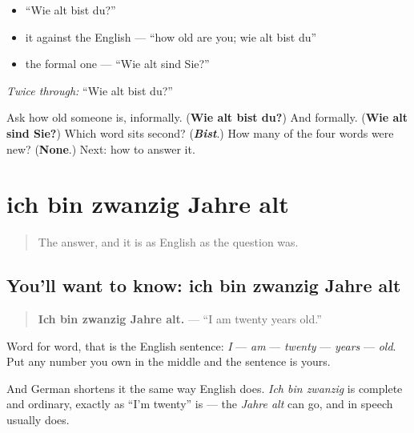 \begin{itemize}
\raggedright
  \item \textquotedblleft{}Wie alt bist du?\textquotedblright{}
  \item it against the English — \textquotedblleft{}how old are you; wie alt bist du\textquotedblright{}
  \item the formal one — \textquotedblleft{}Wie alt sind Sie?\textquotedblright{}
\end{itemize}

\emph{Twice through:} \textquotedblleft{}Wie alt bist du?\textquotedblright{}

\begin{tcolorbox}[breakable,colback=teal!4,colframe=teal!35!black,title={Before you move on}]
Ask how old someone is, informally. (\textbf{Wie alt bist du?}) And formally. (\textbf{Wie alt sind Sie?}) Which word sits second? (\emph{\textbf{Bist}}.) How many of the four words were new? (\textbf{None}.) Next: how to answer it.
\end{tcolorbox}
\section[ich bin zwanzig Jahre alt]{ich bin zwanzig Jahre alt}

\label{lesson:GE-C14-alter}



\begin{quote}
The answer, and it is as English as the question was.
\end{quote}

\subsection*{You'll want to know: ich bin zwanzig Jahre alt}
\begin{quote}
\textbf{Ich bin zwanzig Jahre alt.} — \textquotedblleft{}I am twenty years old.\textquotedblright{}
\end{quote}

Word for word, that is the English sentence: \emph{I} — \emph{am} — \emph{twenty} — \emph{years} — \emph{old}. Put any number you own in the middle and the sentence is yours.

And German shortens it the same way English does. \emph{Ich bin zwanzig} is complete and ordinary, exactly as \textquotedblleft{}I'm twenty\textquotedblright{} is — the \emph{Jahre alt} can go, and in speech usually does.

